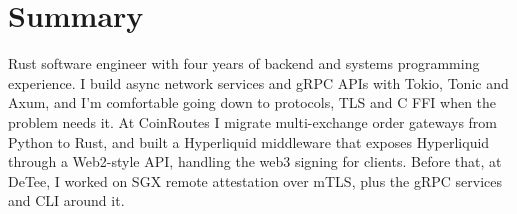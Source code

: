 \documentclass[11pt,a4paper,sans]{moderncv}
\begin{document}
\section{Summary}
{
  Rust software engineer with four years of backend and systems programming experience. I build async network services and gRPC APIs with Tokio, Tonic and Axum, and I'm comfortable going down to protocols, TLS and C FFI when the problem needs it. At CoinRoutes I migrate multi-exchange order gateways from Python to Rust, and built a Hyperliquid middleware that exposes Hyperliquid through a Web2-style API, handling the web3 signing for clients. Before that, at DeTee, I worked on SGX remote attestation over mTLS, plus the gRPC services and CLI around it.

}
\end{document}
